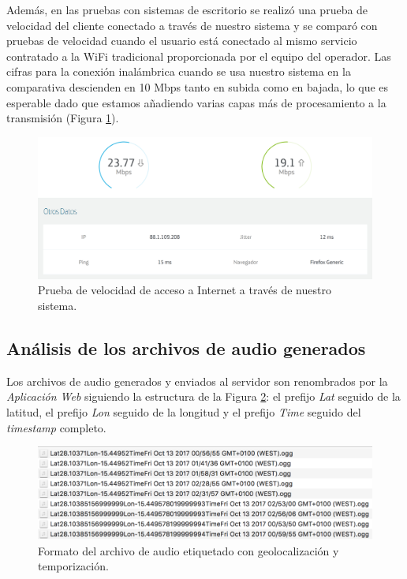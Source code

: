 Además, en las pruebas con sistemas de escritorio se realizó una prueba de velocidad del cliente conectado a través de nuestro sistema y se comparó con pruebas de velocidad cuando el usuario está conectado al mismo servicio contratado a la WiFi tradicional proporcionada por el equipo del operador. Las cifras para la conexión inalámbrica cuando se usa nuestro sistema en la comparativa descienden en 10 Mbps tanto en subida como en bajada, lo que es esperable dado que estamos añadiendo varias capas más de procesamiento a la transmisión (Figura \ref{speed}).

\begin{figure}[!t]
\begin{center}
\includegraphics[width=0.75\linewidth]{./6_EvalEmpirica/Img/speed.png}
\end{center}
\caption{Prueba de velocidad de acceso a Internet a través de nuestro sistema.}
\label{speed}
\end{figure}

\subsection{Análisis de los archivos de audio generados}
Los archivos de audio generados y enviados al servidor son renombrados por la \emph{Aplicación Web} siguiendo la estructura de la Figura \ref{audioFiles}: el prefijo \emph{Lat} seguido de la latitud, el prefijo \emph{Lon} seguido de la longitud y el prefijo \emph{Time} seguido del \emph{timestamp} completo.

\begin{figure}[!t]
\begin{center}
\includegraphics[width=0.75\linewidth]{./6_EvalEmpirica/Img/audioFiles.png}
\end{center}
\caption{Formato del archivo de audio etiquetado con geolocalización y temporización.}
\label{audioFiles}
\end{figure}

